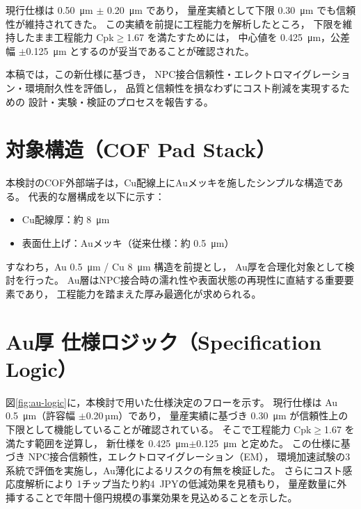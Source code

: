 \documentclass[conference]{IEEEtran}
\begin{document}
現行仕様は \SI{0.50}{\micro\meter} $\pm$ \SI{0.20}{\micro\meter} であり，
量産実績として下限 \SI{0.30}{\micro\meter} でも信頼性が維持されてきた。
この実績を前提に工程能力を解析したところ，
下限を維持したまま工程能力 Cpk$\geq$1.67 を満たすためには，
中心値を \SI{0.425}{\micro\meter}，公差幅 $\pm$\SI{0.125}{\micro\meter} とするのが妥当であることが確認された。

本稿では，この新仕様に基づき，
NPC接合信頼性・エレクトロマイグレーション・環境耐久性を評価し，
品質と信頼性を損なわずにコスト削減を実現するための
設計・実験・検証のプロセスを報告する。

\section{対象構造（COF Pad Stack）}
本検討のCOF外部端子は，Cu配線上にAuメッキを施したシンプルな構造である。
代表的な層構成を以下に示す：

\begin{itemize}
  \item Cu配線厚：約 \SI{8}{\micro\meter}
  \item 表面仕上げ：Auメッキ（従来仕様：約 \SI{0.5}{\micro\meter}）
\end{itemize}

すなわち，Au \SI{0.5}{\micro\meter} / Cu \SI{8}{\micro\meter} 構造を前提とし，
Au厚を合理化対象として検討を行った。  
Au層はNPC接合時の濡れ性や表面状態の再現性に直結する重要要素であり，
工程能力を踏まえた厚み最適化が求められる。

\section{Au厚 仕様ロジック（Specification Logic）}
図\ref{fig:au-logic}に，本検討で用いた仕様決定のフローを示す。
現行仕様は Au \SI{0.5}{\micro\meter}（許容幅 $\pm$0.20\,µm）であり，
量産実績に基づき \SI{0.30}{\micro\meter} が信頼性上の下限として機能していることが確認されている。
そこで工程能力 Cpk$\geq$1.67 を満たす範囲を逆算し，
新仕様を \SI{0.425}{\micro\meter}$\pm$\SI{0.125}{\micro\meter} と定めた。
この仕様に基づき NPC接合信頼性，エレクトロマイグレーション（EM），
環境加速試験の3系統で評価を実施し，Au薄化によるリスクの有無を検証した。
さらにコスト感応度解析により 1チップ当たり約\SI{4}{JPY}の低減効果を見積もり，
量産数量に外挿することで年間十億円規模の事業効果を見込めることを示した。
\end{document}

